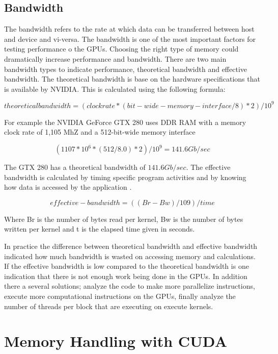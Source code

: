 \subsection{Bandwidth}

The bandwidth refers to the rate at which data can be transferred between host and device and vi-versa. The bandwidth is one of the most important factors for testing performance o the GPUs. Choosing the right type of memory could dramatically increase performance and bandwidth. There are two main bandwidth types to indicate performance, theoretical bandwidth and effective bandwidth. The theoretical bandwidth is base on the hardware specifications that is available by NVIDIA. This is calculated using the following formula:

$$ theoretical bandwidth = (clock rate * (bit-wide-memory-interface / 8 )*2) / 10^9 $$

For example the NVIDIA GeForce GTX 280 uses DDR RAM with a memory clock rate of 1,105 MhZ and a 512-bit-wide memory interface

$$ (1107 * 10^6 * (512/8.0) *2 )/10^9 = 141.6 Gb /sec$$

The GTX 280 has a theoretical bandwidth of $141.6Gb/sec$.
The effective bandwidth is calculated by timing specific program activities and by knowing how data is accessed by the application \cite{practices}.

$$effective-bandwidth = ((Br - Bw) / 109 )/time$$

Where Br is the number of bytes read per kernel, Bw is the number of bytes written per kernel and  t is the elapsed time given in seconds\cite{fortran}.

In practice the difference between theoretical bandwidth and effective bandwidth indicated how much bandwidth is wasted on accessing memory and calculations. If the effective bandwidth is low compared to the theoretical bandwidth is one indication that there is not enough work being done in the GPUs. In addition there a several solutions; analyze the code to make more parallelize instructions, execute more computational instructions on the GPUs, finally analyze the number of threads per block that are executing on execute kernels.

\section{Memory Handling with CUDA}


